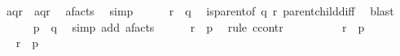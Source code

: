 \begin{isabellebody}
\ {\isachardoublequoteopen}{\isacharparenleft}{\kern0pt}{\isacharparenleft}{\kern0pt}{\isacharparenleft}{\kern0pt}{\isacharparenleft}{\kern0pt}{\isacharbrackleft}{\kern0pt}a{\isacharbrackright}{\kern0pt}{\isacharparenright}{\kern0pt}{\isasymdown}\isactrlsub {\isacharbang}{\kern0pt}{\isacharparenright}{\kern0pt}{\isasymdown}\isactrlsub {\isacharbraceleft}{\kern0pt}\isactrlsub q\isactrlsub {\isacharcomma}{\kern0pt}\isactrlsub r\isactrlsub {\isacharbraceright}{\kern0pt}{\isacharparenright}{\kern0pt}{\isasymdown}\isactrlsub {\isacharbang}{\kern0pt}\isactrlsub {\isacharquery}{\kern0pt}{\isacharparenright}{\kern0pt}\ {\isacharequal}{\kern0pt}\ {\isacharparenleft}{\kern0pt}{\isacharparenleft}{\kern0pt}{\isacharparenleft}{\kern0pt}{\isacharbrackleft}{\kern0pt}a{\isacharbrackright}{\kern0pt}{\isacharparenright}{\kern0pt}{\isasymdown}\isactrlsub {\isacharbraceleft}{\kern0pt}\isactrlsub q\isactrlsub {\isacharcomma}{\kern0pt}\isactrlsub r\isactrlsub {\isacharbraceright}{\kern0pt}{\isacharparenright}{\kern0pt}{\isasymdown}\isactrlsub {\isacharbang}{\kern0pt}\isactrlsub {\isacharquery}{\kern0pt}{\isacharparenright}{\kern0pt}{\isachardoublequoteclose}\ \isamarkupfalse%
\ a{\isacharunderscore}{\kern0pt}facts\ \isamarkupfalse%
\ simp\isanewline
\ \ \ \ \isamarkupfalse%
\ {\isachardoublequoteopen}r\ {\isasymnoteq}\ q{\isachardoublequoteclose}\ \isamarkupfalse%
\ {\isacartoucheopen}is{\isacharunderscore}{\kern0pt}parent{\isacharunderscore}{\kern0pt}of\ q\ r{\isacartoucheclose}\ parent{\isacharunderscore}{\kern0pt}child{\isacharunderscore}{\kern0pt}diff\ \isamarkupfalse%
\ blast\isanewline
\ \ \ \ \isamarkupfalse%
\ {\isachardoublequoteopen}p\ {\isasymnoteq}\ q{\isachardoublequoteclose}\ \isamarkupfalse%
\ {\isacharparenleft}{\kern0pt}simp\ add{\isacharcolon}{\kern0pt}\ a{\isacharunderscore}{\kern0pt}facts{\isacharparenright}{\kern0pt}\isanewline
\ \ \ \ \isamarkupfalse%
\ {\isachardoublequoteopen}r\ {\isasymnoteq}\ p{\isachardoublequoteclose}\ \isamarkupfalse%
\ {\isacharparenleft}{\kern0pt}rule\ ccontr{\isacharparenright}{\kern0pt}\ \isanewline
\ \ \ \ \ \ \isamarkupfalse%
\ {\isachardoublequoteopen}{\isasymnot}\ r\ {\isasymnoteq}\ p{\isachardoublequoteclose}\isanewline
\ \ \ \ \ \ \isamarkupfalse%
\ \isamarkupfalse%
\ {\isachardoublequoteopen}r\ {\isacharequal}{\kern0pt}\ p{\isachardoublequoteclose}\ \isamarkupfalse%

\end{isabellebody}
